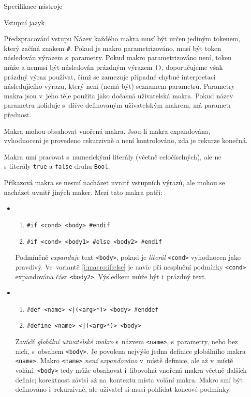 \documentclass[thesis=M,czech]{FITthesis}[2012/06/26]
\newcommand{\id}[1]{\texttt{#1}}
\newcommand{\hl}[1]{\textit{#1}}
\newcommand{\rf}[1]{\ref{#1}}
\begin{document}
\begin{section}{Specifikace nástroje}
\begin{subsection}{Vstupní jazyk}
\begin{subsubsection}{Předzpracování vstupu}
Název každého makra musí být určen jediným tokenem,
který začíná znakem \id{\#}.
Pokud je makro parametrizováno,
musí být token následován výrazem s~parametry.
Pokud makro parametrizováno není,
token může a nemusí být následován prázdným výrazem \id{()},
doporučujeme však prázdný výraz používat,
čímž se zamezuje případné chybné interpretaci následujícího výrazu,
který není (nemá být) seznamem parametrů.
Parametry makra jsou v~jeho těle použita
jako dočasná uživatelská makra. Pokud název parametru
koliduje s~dříve definovaným uživatelským makrem,
má parametr přednost.

Makra mohou obsahovat vnořená makra.
Jsou-li makra expandována, vyhodnocení je provedeno rekurzivně
a není kontrolováno, zda je rekurze konečná.

Makra umí pracovat s~numerickými literály (včetně celočíselných),
ale ne s~literály \id{true} a \id{false} druhu \id{Bool}.


\begin{paragraph}{Příkazová makra}
\label{p:design:spec:ilang:macros:cmd}
se nesmí nacházet uvnitř vstupních výrazů,
ale mohou se nacházet uvnitř jiných maker.
Mezi tato makra patří:
\begin{itemize}
\item
   \begin{enumerate}
   \item \label{i:macro:if:if}
      \id{\#if <cond> <body> \#endif}
   \item \label{i:macro:if:else}
      \id{\#if <cond> <body1> \#else <body2> \#endif}
   \end{enumerate}
   Podmíněně \hl{expanduje} text \id{<body>},
   pokud je \hl{literál} \id{<cond>} vyhodnocen jako pravdivý.
   Ve~variantě \rf{i:macro:if:else}
   je navíc při nesplnění podmínky \id{<cond>}
   expandována část \id{<body2>}.
   Výsledkem může být i~prázdný text.
\item
   \begin{enumerate}
   \item \label{i:macro:def:def}
      \id{\#def <name> <|(<arg>*)> <body> \#enddef}
   \item \label{i:macro:def:define}
      \id{\#define <name> <|(<arg>*)> <body>}
   \end{enumerate}
   Zavádí \hl{globální uživatelské makro} s~názvem \id{<name>},
   s~parametry, nebo bez nich,
   s~obsahem \id{<body>}.
   Je povolena nejvýše jedna definice globálního makra \id{<name>}.
   Makro \id{<name>} \hl{není expandováno} v~místě definice,
   ale až v~místě volání.
   \id{<body>} tedy může obsahovat i~libovolná vnořená makra
   včetně dalších definic; korektnost závisí až na~kontextu
   místa volání makra. Makro smí být definováno i~rekurzivně,
   ale uživatel si musí pohlídat koncové podmínky.


\end{itemize}
\end{paragraph}
\end{subsubsection}
\end{subsection}
\end{section}
\end{document}
